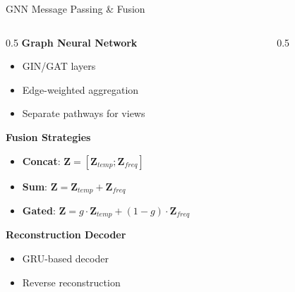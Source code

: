 \documentclass[aspectratio=169,11pt]{beamer}
\begin{document}
\begin{frame}{GNN Message Passing \& Fusion}
    \begin{columns}
        \begin{column}{0.5\textwidth}
            \textbf{Graph Neural Network}
            \begin{itemize}
                \item GIN/GAT layers
                \item Edge-weighted aggregation
                \item Separate pathways for views
            \end{itemize}

            \vspace{0.3cm}
            \textbf{Fusion Strategies}
            \begin{itemize}
                \item \textbf{Concat}: $\mathbf{Z} = [\mathbf{Z}_{temp}; \mathbf{Z}_{freq}]$
                \item \textbf{Sum}: $\mathbf{Z} = \mathbf{Z}_{temp} + \mathbf{Z}_{freq}$
                \item \textbf{Gated}: $\mathbf{Z} = g \cdot \mathbf{Z}_{temp} + (1-g) \cdot \mathbf{Z}_{freq}$
            \end{itemize}

            \vspace{0.3cm}
            \textbf{Reconstruction Decoder}
            \begin{itemize}
                \item GRU-based decoder
                \item Reverse reconstruction
            \end{itemize}
        \end{column}
        \begin{column}{0.5\textwidth}
            
        \end{column}
    \end{columns}
\end{frame}
\end{document}
